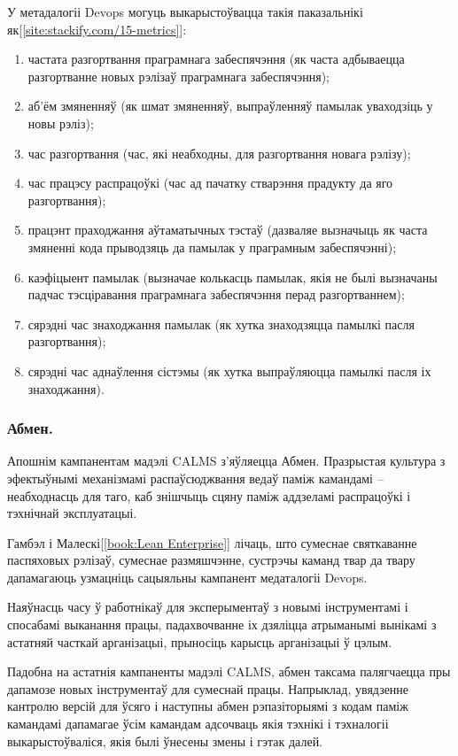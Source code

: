 У метадалогіі Devops могуць выкарыстоўвацца
такія паказальнікі як[\ref{site:stackify.com/15-metrics}]:
\begin{enumerate}
    \item частата разгортвання праграмнага забеспячэння
          (як часта адбываецца разгортванне
           новых рэлізаў праграмнага забеспячэння);
    \item аб'ём змяненняў (як шмат змяненняў, выпраўленняў памылак
          уваходзіць у новы рэліз);
    \item час разгортвання (час, які неабходны, для
          разгортвання новага рэлізу);
    \item час працэсу распрацоўкі (час ад пачатку
          стварэння прадукту да яго разгортвання);
    \item працэнт праходжання аўтаматычных тэстаў
          (дазваляе вызначыць як часта змяненні кода
           прыводзяць да памылак у праграмным забеспячэнні);
    \item каэфіцыент памылак (вызначае колькасць памылак,
          якія не былі вызначаны падчас тэсціравання
          праграмнага забеспячэння перад разгортваннем);
    \item сярэдні час знаходжання памылак (як хутка
          знаходзяцца памылкі пасля разгортвання);
    \item сярэдні час аднаўлення сістэмы (як хутка
          выпраўляюцца памылкі пасля іх знаходжання).
\end{enumerate}

\subsubsection{Абмен.}
Апошнім кампанентам мадэлі CALMS з'яўляецца Абмен.
Празрыстая культура з эфектыўнымі механізмамі распаўсюджвання
ведаў паміж камандамі -- неабходнасць для таго, каб знішчыць
сцяну паміж аддзеламі распрацоўкі і тэхнічнай эксплуатацыі.

Гамбэл і Малескі[\ref{book:Lean Enterprise}] лічаць, што
сумеснае святкаванне паспяховых рэлізаў, сумеснае размяшчэнне,
сустрэчы каманд твар да твару дапамагаюць узмацніць
сацыяльны кампанент медаталогіі Devops.

Наяўнасць часу ў работнікаў для эксперыментаў з новымі
інструментамі і спосабамі выканання працы, падахвочванне іх
дзяліцца атрыманымі вынікамі з астатняй часткай арганізацыі,
прыносіць карысць арганізацыі ў цэлым.

Падобна на астатнія кампаненты мадэлі CALMS, абмен таксама
палягчаецца пры дапамозе новых інструментаў для сумеснай працы.
Напрыклад, увядзенне кантролю версій для ўсяго і наступны абмен
рэпазіторыямі з кодам паміж камандамі дапамагае ўсім камандам
адсочваць якія тэхнікі і тэхналогіі выкарыстоўваліся, якія былі
ўнесены змены і гэтак далей.

